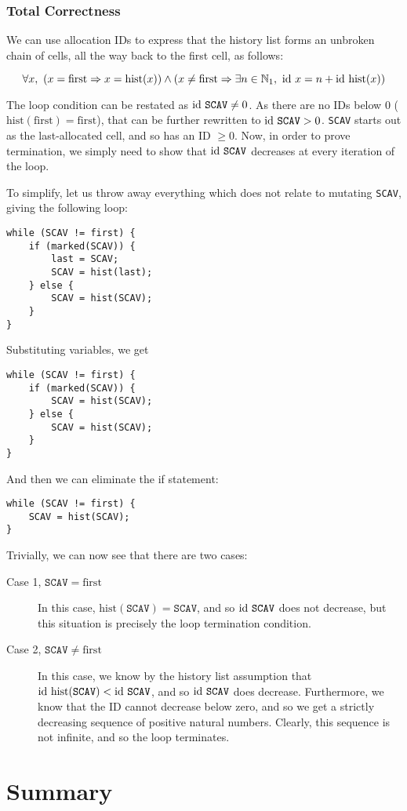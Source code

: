 \subsubsection{Total Correctness}

We can use allocation IDs to express that the history list forms an
unbroken chain of cells, all the way back to the first cell, as
follows:

\[\forall x,\ \left(x = \mathrm{first} \Rightarrow x =
  \mathrm{hist}(x)\right) \land \left(x \neq \mathrm{first} \Rightarrow
  \exists n \in \mathbb N_{1},\ \mathrm{id}~x = n +
  \mathrm{id}~\mathrm{hist}(x)\right)\]

The loop condition can be restated as $\mathrm{id}~\mathtt{SCAV} \neq 0$. As
there are no IDs below 0 ($\mathrm{hist}(\mathrm{first}) =
\mathrm{first}$), that can be further rewritten to $\mathrm{id}~\mathtt{SCAV}
> 0$. \texttt{SCAV} starts out as the last-allocated cell, and so has
an ID $\geq 0$. Now, in order to prove termination, we simply need to
show that $\mathrm{id}~\mathtt{SCAV}$ decreases at every iteration of the
loop.

To simplify, let us throw away everything which does not relate to
mutating \texttt{SCAV}, giving the following loop:

\begin{lstlisting}
while (SCAV != first) {
    if (marked(SCAV)) {
        last = SCAV;
        SCAV = hist(last);
    } else {
        SCAV = hist(SCAV);
    }
}
\end{lstlisting}

Substituting variables, we get

\begin{lstlisting}
while (SCAV != first) {
    if (marked(SCAV)) {
        SCAV = hist(SCAV);
    } else {
        SCAV = hist(SCAV);
    }
}
\end{lstlisting}

And then we can eliminate the if statement:

\begin{lstlisting}
while (SCAV != first) {
    SCAV = hist(SCAV);
}
\end{lstlisting}

Trivially, we can now see that there are two cases:

\begin{description}
  \item[Case 1, $\mathtt{SCAV} = \mathrm{first}$] In this case,
    $\mathrm{hist}(\mathtt{SCAV}) = \mathtt{SCAV}$, and so
    $\mathrm{id}~\mathtt{SCAV}$ does not decrease, but this situation is
    precisely the loop termination condition.

  \item[Case 2, $\mathtt{SCAV} \neq \mathrm{first}$] In this case, we
    know by the history list assumption that
    $\mathrm{id}~\mathrm{hist}(\mathtt{SCAV}) < \mathrm{id}~\mathtt{SCAV}$, and so
    $\mathrm{id}~\mathtt{SCAV}$ does decrease. Furthermore, we know that the
    ID cannot decrease below zero, and so we get a strictly decreasing
    sequence of positive natural numbers. Clearly, this sequence is
    not infinite, and so the loop terminates.
\end{description}

\section{Summary}

